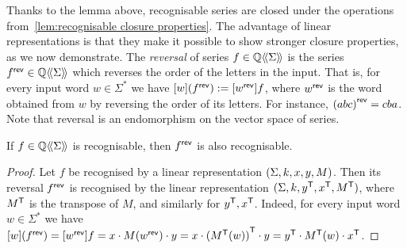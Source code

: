 %
\noindent
Thanks to the lemma above,
recognisable series are closed under the operations from~\cref{lem:recognisable closure properties}.
%
The advantage of linear representations is that they make it possible to show stronger closure properties,
as we now demonstrate.
%
The \emph{reversal} of series $f \in \mathbb Q\langle\!\langle\Sigma\rangle\!\rangle$ is the series ${f}^\mathsf{rev} \in \mathbb Q\langle\!\langle\Sigma\rangle\!\rangle$
which reverses the order of the letters in the input.
%
That is, for every input word $w \in \Sigma^*$ we have $[w]({f}^\mathsf{rev}) := [{w}^\mathsf{rev}]f$,
where ${w}^\mathsf{rev}$ is the word obtained from $w$ by reversing the order of its letters.
%
For instance, ${(a b c)}^\mathsf{rev} = c b a$.
%
Note that reversal is an endomorphism on the vector space of series.
%
\begin{lemma}
    If $f \in \mathbb Q\langle\!\langle\Sigma\rangle\!\rangle$ is recognisable, then ${f}^\mathsf{rev}$ is also recognisable.
\end{lemma}
%
\begin{proof}
    Let $f$ be recognised by a linear representation $(\Sigma, k, x, y, M)$.
    Then its reversal ${f}^\mathsf{rev}$ is recognised by the linear representation $(\Sigma, k, {y}^\mathsf{T}, {x}^\mathsf{T}, {M}^\mathsf{T})$,
    where ${M}^\mathsf{T}$ is the transpose of $M$, and similarly for ${y}^\mathsf{T}, {x}^\mathsf{T}$.
    Indeed, for every input word $w \in \Sigma^*$ we have
    $
        [w]({f}^\mathsf{rev})
        = [{w}^\mathsf{rev}]f
        = x \cdot M({w}^\mathsf{rev}) \cdot y
        = x \cdot {({M}^\mathsf{T}(w))}^\mathsf{T} \cdot y
        = {y}^\mathsf{T} \cdot {M}^\mathsf{T}(w) \cdot {x}^\mathsf{T}
    $.
\end{proof}
